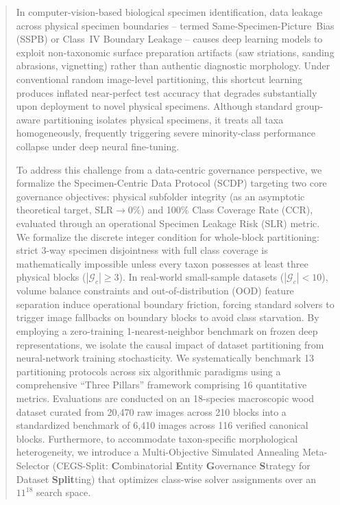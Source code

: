 \documentclass[a4paper,fleqn]{cas-sc}
\begin{document}
\begin{abstract}
In computer-vision-based biological specimen identification, data leakage across physical specimen boundaries -- termed \mbox{Same-Specimen-Picture Bias} (SSPB) or Class~IV Boundary Leakage -- causes deep learning models to exploit non-taxonomic surface preparation artifacts (saw striations, sanding abrasions, vignetting) rather than authentic diagnostic morphology. Under conventional random image-level partitioning, this shortcut learning produces inflated near-perfect test accuracy that degrades substantially upon deployment to novel physical specimens. Although standard group-aware partitioning isolates physical specimens, it treats all taxa homogeneously, frequently triggering severe minority-class performance collapse under deep neural fine-tuning.

To address this challenge from a data-centric governance perspective, we formalize the Specimen-Centric Data Protocol (SCDP) targeting two core governance objectives: physical subfolder integrity (as an asymptotic theoretical target, $\mathrm{SLR} \to 0\%$) and 100\% Class Coverage Rate ($\mathrm{CCR}$), evaluated through an operational Specimen Leakage Risk ($\mathrm{SLR}$) metric. We formalize the discrete integer condition for whole-block partitioning: strict 3-way specimen disjointness with full class coverage is mathematically impossible unless every taxon possesses at least three physical blocks ($|\mathcal{G}_c| \ge 3$). In real-world small-sample datasets ($|\mathcal{G}_c| < 10$), volume balance constraints and out-of-distribution (OOD) feature separation induce operational boundary friction, forcing standard solvers to trigger image fallbacks on boundary blocks to avoid class starvation. By employing a zero-training 1-nearest-neighbor benchmark on frozen deep representations, we isolate the causal impact of dataset partitioning from neural-network training stochasticity. We systematically benchmark 13 partitioning protocols across six algorithmic paradigms using a comprehensive ``Three Pillars'' framework comprising 16 quantitative metrics. Evaluations are conducted on an 18-species macroscopic wood dataset curated from 20,470 raw images across 210 blocks into a standardized benchmark of 6,410 images across 116 verified canonical blocks. Furthermore, to accommodate taxon-specific morphological heterogeneity, we introduce a Multi-Objective Simulated Annealing Meta-Selector (CEGS-Split: \textbf{C}ombinatorial \textbf{E}ntity \textbf{G}overnance \textbf{S}trategy for Dataset \textbf{Split}ting) that optimizes class-wise solver assignments over an $11^{18}$ search space.


\end{abstract}
\end{document}
